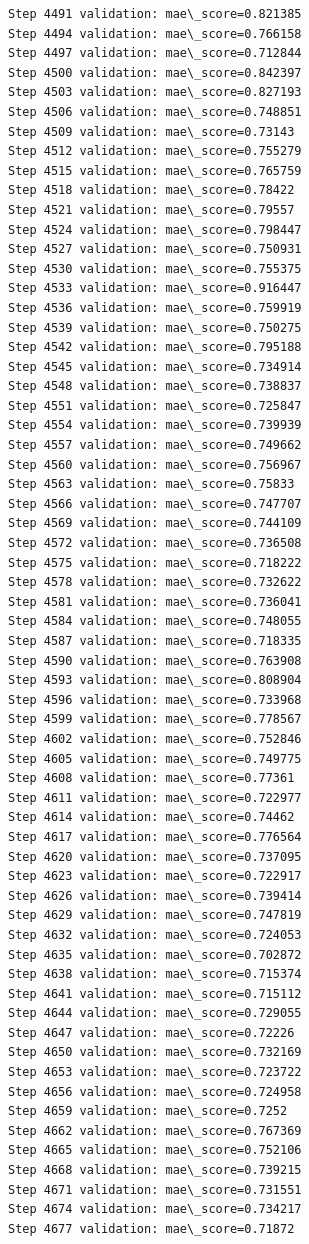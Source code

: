 \documentclass[11pt]{article}
\begin{document}
\begin{Verbatim}[commandchars=\\\{\}]
Step 4491 validation: mae\_score=0.821385
Step 4494 validation: mae\_score=0.766158
Step 4497 validation: mae\_score=0.712844
Step 4500 validation: mae\_score=0.842397
Step 4503 validation: mae\_score=0.827193
Step 4506 validation: mae\_score=0.748851
Step 4509 validation: mae\_score=0.73143
Step 4512 validation: mae\_score=0.755279
Step 4515 validation: mae\_score=0.765759
Step 4518 validation: mae\_score=0.78422
Step 4521 validation: mae\_score=0.79557
Step 4524 validation: mae\_score=0.798447
Step 4527 validation: mae\_score=0.750931
Step 4530 validation: mae\_score=0.755375
Step 4533 validation: mae\_score=0.916447
Step 4536 validation: mae\_score=0.759919
Step 4539 validation: mae\_score=0.750275
Step 4542 validation: mae\_score=0.795188
Step 4545 validation: mae\_score=0.734914
Step 4548 validation: mae\_score=0.738837
Step 4551 validation: mae\_score=0.725847
Step 4554 validation: mae\_score=0.739939
Step 4557 validation: mae\_score=0.749662
Step 4560 validation: mae\_score=0.756967
Step 4563 validation: mae\_score=0.75833
Step 4566 validation: mae\_score=0.747707
Step 4569 validation: mae\_score=0.744109
Step 4572 validation: mae\_score=0.736508
Step 4575 validation: mae\_score=0.718222
Step 4578 validation: mae\_score=0.732622
Step 4581 validation: mae\_score=0.736041
Step 4584 validation: mae\_score=0.748055
Step 4587 validation: mae\_score=0.718335
Step 4590 validation: mae\_score=0.763908
Step 4593 validation: mae\_score=0.808904
Step 4596 validation: mae\_score=0.733968
Step 4599 validation: mae\_score=0.778567
Step 4602 validation: mae\_score=0.752846
Step 4605 validation: mae\_score=0.749775
Step 4608 validation: mae\_score=0.77361
Step 4611 validation: mae\_score=0.722977
Step 4614 validation: mae\_score=0.74462
Step 4617 validation: mae\_score=0.776564
Step 4620 validation: mae\_score=0.737095
Step 4623 validation: mae\_score=0.722917
Step 4626 validation: mae\_score=0.739414
Step 4629 validation: mae\_score=0.747819
Step 4632 validation: mae\_score=0.724053
Step 4635 validation: mae\_score=0.702872
Step 4638 validation: mae\_score=0.715374
Step 4641 validation: mae\_score=0.715112
Step 4644 validation: mae\_score=0.729055
Step 4647 validation: mae\_score=0.72226
Step 4650 validation: mae\_score=0.732169
Step 4653 validation: mae\_score=0.723722
Step 4656 validation: mae\_score=0.724958
Step 4659 validation: mae\_score=0.7252
Step 4662 validation: mae\_score=0.767369
Step 4665 validation: mae\_score=0.752106
Step 4668 validation: mae\_score=0.739215
Step 4671 validation: mae\_score=0.731551
Step 4674 validation: mae\_score=0.734217
Step 4677 validation: mae\_score=0.71872

\end{Verbatim}
\end{document}
